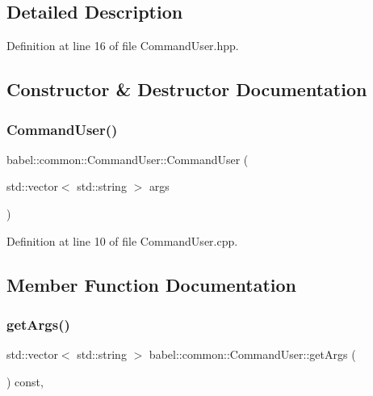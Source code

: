 \subsection{Detailed Description}


Definition at line 16 of file Command\+User.\+hpp.



\subsection{Constructor \& Destructor Documentation}
\mbox{\label{classbabel_1_1common_1_1_command_user_a25ad5bc375d017433d007caece14723b}} 
\subsubsection{\texorpdfstring{Command\+User()}{CommandUser()}}
{\footnotesize\ttfamily babel\+::common\+::\+Command\+User\+::\+Command\+User (\begin{DoxyParamCaption}\item[{std\+::vector$<$ std\+::string $>$}]{args }\end{DoxyParamCaption})}



Definition at line 10 of file Command\+User.\+cpp.



\subsection{Member Function Documentation}
\mbox{\label{classbabel_1_1common_1_1_command_user_ac23ded08ec9e57e2a5f3c7374d9fa232}} 
\subsubsection{\texorpdfstring{get\+Args()}{getArgs()}}
{\footnotesize\ttfamily std\+::vector$<$ std\+::string $>$ babel\+::common\+::\+Command\+User\+::get\+Args (\begin{DoxyParamCaption}{ }\end{DoxyParamCaption}) const\hspace{0.3cm}{\ttfamily [override]}, {\ttfamily [virtual]}}



